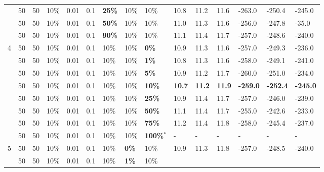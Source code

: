 \begin{table}
\begin{tabular}{|l|l|l|l|l|l|l|l|l||l|l|l|l|l|l|}
    ~ & 50 & 50 & 10\% & 0.01 & 0.1 & \textbf{25\%} & 10\% & 10\% & 10.8 & 11.2 & 11.6 & -263.0 & -250.4 & -245.0 \\
    ~ & 50 & 50 & 10\% & 0.01 & 0.1 & \textbf{50\%} & 10\% & 10\% & 11.0 & 11.3 & 11.6 & -256.0 & -247.8 & -35.0 \\
    ~ & 50 & 50 & 10\% & 0.01 & 0.1 & \textbf{90\%} & 10\% & 10\% & 11.1 & 11.4 & 11.7 & -257.0 & -248.6 & -240.0 \\
    \hline
    4 & 50 & 50 & 10\% & 0.01 & 0.1 & 10\% & 10\% & \textbf{0\%} & 10.9 & 11.3 & 11.6 & -257.0 & -249.3 & -236.0 \\
    ~ & 50 & 50 & 10\% & 0.01 & 0.1 & 10\% & 10\% & \textbf{1\%} & 10.8 & 11.3 & 11.6 & -258.0 & -249.1 & -241.0 \\
    ~ & 50 & 50 & 10\% & 0.01 & 0.1 & 10\% & 10\% & \textbf{5\%} &  10.9 & 11.2 & 11.7 & -260.0 & -251.0 & -234.0 \\
    ~ & 50 & 50 & 10\% & 0.01 & 0.1 & 10\% & 10\% & \textbf{10\%} & \textbf{10.7} & \textbf{11.2} & \textbf{11.9} & \textbf{-259.0} & \textbf{-252.4} & \textbf{-245.0} \\
    ~ & 50 & 50 & 10\% & 0.01 & 0.1 & 10\% & 10\% & \textbf{25\%} & 10.9 & 11.4 & 11.7 & -257.0 & -246.0 & -239.0 \\
    ~ & 50 & 50 & 10\% & 0.01 & 0.1 & 10\% & 10\% & \textbf{50\%} & 11.1 & 11.4 & 11.7 & -255.0 & -242.6 & -233.0 \\
    ~ & 50 & 50 & 10\% & 0.01 & 0.1 & 10\% & 10\% & \textbf{75\%} & 11.2 & 11.4 & 11.8 & -258.0 & -245.4 & -237.0 \\
    ~ & 50 & 50 & 10\% & 0.01 & 0.1 & 10\% & 10\% & \textbf{100\%$^*$} & - & - & - & - & - & - \\
    \hline
    5 & 50 & 50 & 10\% & 0.01 & 0.1 & 10\% & \textbf{0\%} & 10\% & 10.9 & 11.3 & 11.8 & -257.0 & -248.5 & -240.0 \\
    ~ & 50 & 50 & 10\% & 0.01 & 0.1 & 10\% & \textbf{1\%} & 10\% & ~ & ~ & ~ & ~ & ~ & ~ \\

\end{tabular}
\end{table}
